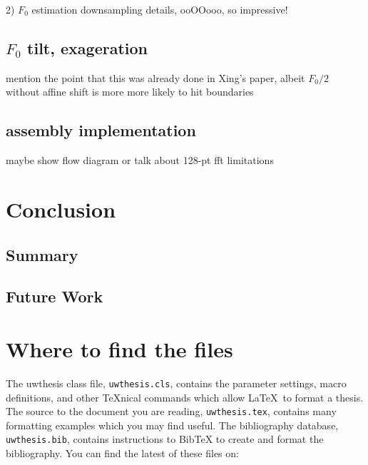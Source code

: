\documentclass [11pt, proquest] {uwthesis}[2015/03/03]
\begin{document}
2) $F_0$ estimation downsampling details, ooOOooo, so impressive!

\section{$F_0$ tilt, exageration}

mention the point that this was already done in Xing's paper, albeit $F_0/2$ without affine shift is more more likely to hit boundaries 

\section{assembly implementation}

maybe show flow diagram or talk about 128-pt fft limitations




\chapter{Conclusion}

\section{Summary}

\section{Future Work}



%
%
\nocite{*}   %


%
%
\appendix
\raggedbottom\sloppy
 
 
\chapter{Where to find the files}
 
The uwthesis class file, {\tt uwthesis.cls}, contains the parameter settings,
macro definitions, and other \TeX nical commands which
allow \LaTeX\ to format a thesis.  
The source to
the document you are reading, {\tt uwthesis.tex},
contains many formatting examples
which you may find useful.
The bibliography database, {\tt uwthesis.bib}, contains instructions
to BibTeX to create and format the bibliography.
You can find the latest of these files on:
\end{document}

